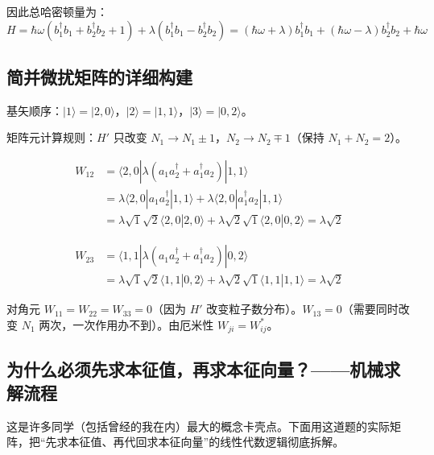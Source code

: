 因此总哈密顿量为：
\[
H = \hbar\omega(b_1^\dagger b_1 + b_2^\dagger b_2 + 1) + \lambda(b_1^\dagger b_1 - b_2^\dagger b_2) = (\hbar\omega+\lambda)b_1^\dagger b_1 + (\hbar\omega-\lambda)b_2^\dagger b_2 + \hbar\omega
\]

\subsection{简并微扰矩阵的详细构建}

基矢顺序：$|1\rangle = |2,0\rangle$，$|2\rangle = |1,1\rangle$，$|3\rangle = |0,2\rangle$。

矩阵元计算规则：$H'$ 只改变 $N_1 \to N_1\pm 1$，$N_2 \to N_2\mp 1$（保持 $N_1+N_2=2$）。

\begin{align*}
W_{12} &= \langle 2,0 | \lambda(a_1 a_2^\dagger + a_1^\dagger a_2) | 1,1 \rangle \\
&= \lambda \langle 2,0 | a_1 a_2^\dagger | 1,1 \rangle + \lambda \langle 2,0 | a_1^\dagger a_2 | 1,1 \rangle \\
&= \lambda \sqrt{1}\sqrt{2} \langle 2,0 | 2,0 \rangle + \lambda \sqrt{2}\sqrt{1} \langle 2,0 | 0,2 \rangle = \lambda\sqrt{2}
\end{align*}

\begin{align*}
W_{23} &= \langle 1,1 | \lambda(a_1 a_2^\dagger + a_1^\dagger a_2) | 0,2 \rangle \\
&= \lambda \sqrt{1}\sqrt{2} \langle 1,1 | 0,2 \rangle + \lambda \sqrt{2}\sqrt{1} \langle 1,1 | 1,1 \rangle = \lambda\sqrt{2}
\end{align*}

对角元 $W_{11} = W_{22} = W_{33} = 0$（因为 $H'$ 改变粒子数分布）。$W_{13} = 0$（需要同时改变 $N_1$ 两次，一次作用办不到）。由厄米性 $W_{ji} = W_{ij}^*$。

\subsection{为什么必须先求本征值，再求本征向量？——机械求解流程}

这是许多同学（包括曾经的我在内）最大的概念卡壳点。下面用这道题的实际矩阵，把``先求本征值、再代回求本征向量''的线性代数逻辑彻底拆解。

